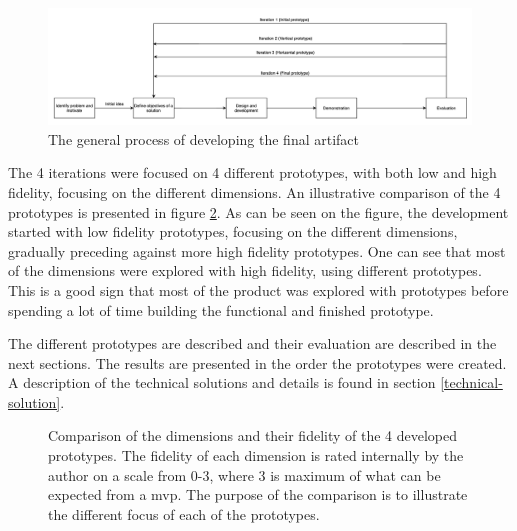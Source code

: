 \documentclass{report}
\begin{document}
\begin{figure}[h!]
    \centering
    \includegraphics[width=\linewidth]{../images/workflow.png}
    \caption{The general process of developing the final artifact}
    \label{fig:workflow}
\end{figure}

The 4 iterations were focused on 4 different prototypes, with both low and high fidelity, focusing on the different dimensions. An illustrative comparison of the 4 prototypes is presented in figure \ref{fig:radar-chart}. As can be seen on the figure, the development started with low fidelity prototypes, focusing on the different dimensions, gradually preceding against more high fidelity prototypes. One can see that most of the dimensions were explored with high fidelity, using different prototypes. This is a good sign that most of the product was explored with prototypes before spending a lot of time building the functional and finished prototype. 

The different prototypes are described and their evaluation are described in the next sections. The results are presented in the order the prototypes were created. A description of the technical solutions and details is found in section \ref{technical-solution}.

\begin{figure}[h!]%
    \centering
    
    
    
    
    
    
    \caption{Comparison of the dimensions and their fidelity of the 4 developed prototypes. The fidelity of each dimension is rated internally by the author on a scale from 0-3, where 3 is maximum of what can be expected from a \gls{mvp}. The purpose of the comparison is to illustrate the different focus of each of the prototypes.}
    \label{fig:radar-chart}
\end{figure}
\end{document}
